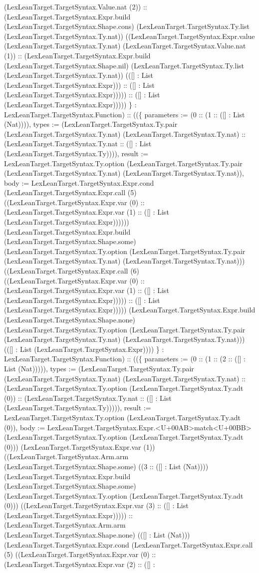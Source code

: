\documentclass[11pt]{article}
\begin{document}
(LexLeanTarget.TargetSyntax.Value.nat (2)) :: (LexLeanTarget.TargetSyntax.Expr.build (LexLeanTarget.TargetSyntax.Shape.cons) (LexLeanTarget.TargetSyntax.Ty.list (LexLeanTarget.TargetSyntax.Ty.nat)) ((LexLeanTarget.TargetSyntax.Expr.value (LexLeanTarget.TargetSyntax.Ty.nat) (LexLeanTarget.TargetSyntax.Value.nat (1)) :: (LexLeanTarget.TargetSyntax.Expr.build (LexLeanTarget.TargetSyntax.Shape.nil) (LexLeanTarget.TargetSyntax.Ty.list (LexLeanTarget.TargetSyntax.Ty.nat)) (([] : List (LexLeanTarget.TargetSyntax.Expr))) :: ([] : List (LexLeanTarget.TargetSyntax.Expr))))) :: ([] : List (LexLeanTarget.TargetSyntax.Expr))))) \} : LexLeanTarget.TargetSyntax.Function) :: ((\{ parameters := (0 :: (1 :: ([] : List (Nat)))), types := (LexLeanTarget.TargetSyntax.Ty.pair (LexLeanTarget.TargetSyntax.Ty.nat) (LexLeanTarget.TargetSyntax.Ty.nat) :: (LexLeanTarget.TargetSyntax.Ty.nat :: ([] : List (LexLeanTarget.TargetSyntax.Ty)))), result := LexLeanTarget.TargetSyntax.Ty.option (LexLeanTarget.TargetSyntax.Ty.pair (LexLeanTarget.TargetSyntax.Ty.nat) (LexLeanTarget.TargetSyntax.Ty.nat)), body := LexLeanTarget.TargetSyntax.Expr.cond (LexLeanTarget.TargetSyntax.Expr.call (5) ((LexLeanTarget.TargetSyntax.Expr.var (0) :: (LexLeanTarget.TargetSyntax.Expr.var (1) :: ([] : List (LexLeanTarget.TargetSyntax.Expr)))))) (LexLeanTarget.TargetSyntax.Expr.build (LexLeanTarget.TargetSyntax.Shape.some) (LexLeanTarget.TargetSyntax.Ty.option (LexLeanTarget.TargetSyntax.Ty.pair (LexLeanTarget.TargetSyntax.Ty.nat) (LexLeanTarget.TargetSyntax.Ty.nat))) ((LexLeanTarget.TargetSyntax.Expr.call (6) ((LexLeanTarget.TargetSyntax.Expr.var (0) :: (LexLeanTarget.TargetSyntax.Expr.var (1) :: ([] : List (LexLeanTarget.TargetSyntax.Expr))))) :: ([] : List (LexLeanTarget.TargetSyntax.Expr))))) (LexLeanTarget.TargetSyntax.Expr.build (LexLeanTarget.TargetSyntax.Shape.none) (LexLeanTarget.TargetSyntax.Ty.option (LexLeanTarget.TargetSyntax.Ty.pair (LexLeanTarget.TargetSyntax.Ty.nat) (LexLeanTarget.TargetSyntax.Ty.nat))) (([] : List (LexLeanTarget.TargetSyntax.Expr)))) \} : LexLeanTarget.TargetSyntax.Function) :: ((\{ parameters := (0 :: (1 :: (2 :: ([] : List (Nat))))), types := (LexLeanTarget.TargetSyntax.Ty.pair (LexLeanTarget.TargetSyntax.Ty.nat) (LexLeanTarget.TargetSyntax.Ty.nat) :: (LexLeanTarget.TargetSyntax.Ty.option (LexLeanTarget.TargetSyntax.Ty.adt (0)) :: (LexLeanTarget.TargetSyntax.Ty.nat :: ([] : List (LexLeanTarget.TargetSyntax.Ty))))), result := LexLeanTarget.TargetSyntax.Ty.option (LexLeanTarget.TargetSyntax.Ty.adt (0)), body := LexLeanTarget.TargetSyntax.Expr.<U+00AB>match<U+00BB> (LexLeanTarget.TargetSyntax.Ty.option (LexLeanTarget.TargetSyntax.Ty.adt (0))) (LexLeanTarget.TargetSyntax.Expr.var (1)) ((LexLeanTarget.TargetSyntax.Arm.arm (LexLeanTarget.TargetSyntax.Shape.some) ((3 :: ([] : List (Nat)))) (LexLeanTarget.TargetSyntax.Expr.build (LexLeanTarget.TargetSyntax.Shape.some) (LexLeanTarget.TargetSyntax.Ty.option (LexLeanTarget.TargetSyntax.Ty.adt (0))) ((LexLeanTarget.TargetSyntax.Expr.var (3) :: ([] : List (LexLeanTarget.TargetSyntax.Expr))))) :: (LexLeanTarget.TargetSyntax.Arm.arm (LexLeanTarget.TargetSyntax.Shape.none) (([] : List (Nat))) (LexLeanTarget.TargetSyntax.Expr.cond (LexLeanTarget.TargetSyntax.Expr.call (5) ((LexLeanTarget.TargetSyntax.Expr.var (0) :: (LexLeanTarget.TargetSyntax.Expr.var (2) :: ([] : 
\end{document}
